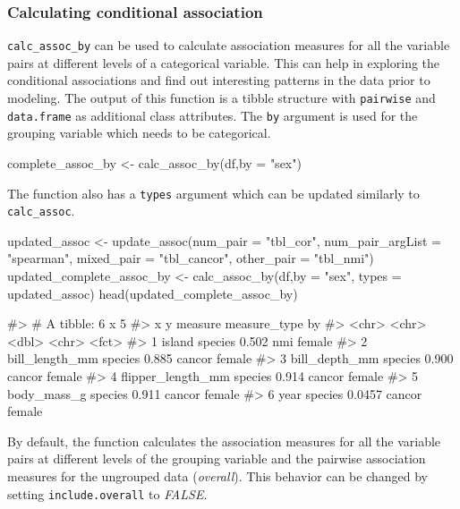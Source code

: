 \hypertarget{calculating-conditional-association}{%
\subsubsection{Calculating conditional
association}\label{calculating-conditional-association}}

\texttt{calc\_assoc\_by} can be used to calculate association measures
for all the variable pairs at different levels of a categorical
variable. This can help in exploring the conditional associations and
find out interesting patterns in the data prior to modeling. The output
of this function is a tibble structure with \texttt{pairwise} and
\texttt{data.frame} as additional class attributes. The \texttt{by}
argument is used for the grouping variable which needs to be
categorical.

\begin{Schunk}
\begin{Sinput}
complete_assoc_by <- calc_assoc_by(df,by = "sex")
\end{Sinput}
\end{Schunk}

The function also has a \texttt{types} argument which can be updated
similarly to \texttt{calc\_assoc}.

\begin{Schunk}
\begin{Sinput}
updated_assoc <- update_assoc(num_pair = "tbl_cor",
                              num_pair_argList = "spearman",
                              mixed_pair = "tbl_cancor",
                              other_pair = "tbl_nmi")
updated_complete_assoc_by <- calc_assoc_by(df,by = "sex", types = updated_assoc)
head(updated_complete_assoc_by)
\end{Sinput}
\begin{Soutput}
#> # A tibble: 6 x 5
#>   x                 y       measure measure_type by    
#>   <chr>             <chr>     <dbl> <chr>        <fct> 
#> 1 island            species  0.502  nmi          female
#> 2 bill_length_mm    species  0.885  cancor       female
#> 3 bill_depth_mm     species  0.900  cancor       female
#> 4 flipper_length_mm species  0.914  cancor       female
#> 5 body_mass_g       species  0.911  cancor       female
#> 6 year              species  0.0457 cancor       female
\end{Soutput}
\end{Schunk}

By default, the function calculates the association measures for all the
variable pairs at different levels of the grouping variable and the
pairwise association measures for the ungrouped data (\emph{overall}).
This behavior can be changed by setting \texttt{include.overall} to
\emph{FALSE}.


